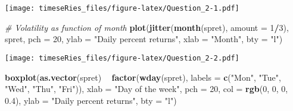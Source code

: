 \documentclass[]{book}
\newenvironment{Shaded}{\begin{snugshade}}{\end{snugshade}}
\newcommand{\KeywordTok}[1]{\textcolor[rgb]{0.13,0.29,0.53}{\textbf{#1}}}
\newcommand{\DataTypeTok}[1]{\textcolor[rgb]{0.13,0.29,0.53}{#1}}
\newcommand{\DecValTok}[1]{\textcolor[rgb]{0.00,0.00,0.81}{#1}}
\newcommand{\FloatTok}[1]{\textcolor[rgb]{0.00,0.00,0.81}{#1}}
\newcommand{\StringTok}[1]{\textcolor[rgb]{0.31,0.60,0.02}{#1}}
\newcommand{\CommentTok}[1]{\textcolor[rgb]{0.56,0.35,0.01}{\textit{#1}}}
\newcommand{\OperatorTok}[1]{\textcolor[rgb]{0.81,0.36,0.00}{\textbf{#1}}}
\newcommand{\NormalTok}[1]{#1}
\begin{document}
\begin{Shaded}
\end{Shaded}

\texttt{[image: timeseRies\_files/figure-latex/Question\_2-1.pdf]}

\begin{Shaded}
\begin{Highlighting}[]
\CommentTok{# Volatility as function of month}
\KeywordTok{plot}\NormalTok{(}\KeywordTok{jitter}\NormalTok{(}\KeywordTok{month}\NormalTok{(spret), }\DataTypeTok{amount =} \DecValTok{1}\OperatorTok{/}\DecValTok{3}\NormalTok{), spret, }\DataTypeTok{pch =} \DecValTok{20}\NormalTok{, }\DataTypeTok{ylab =} \StringTok{"Daily percent returns"}\NormalTok{, }
    \DataTypeTok{xlab =} \StringTok{"Month"}\NormalTok{, }\DataTypeTok{bty =} \StringTok{"l"}\NormalTok{)}
\end{Highlighting}
\end{Shaded}

\texttt{[image: timeseRies\_files/figure-latex/Question\_2-2.pdf]}

\begin{Shaded}
\begin{Highlighting}[]
\KeywordTok{boxplot}\NormalTok{(}\KeywordTok{as.vector}\NormalTok{(spret) }\OperatorTok{~}\StringTok{ }\KeywordTok{factor}\NormalTok{(}\KeywordTok{wday}\NormalTok{(spret), }\DataTypeTok{labels =} \KeywordTok{c}\NormalTok{(}\StringTok{"Mon"}\NormalTok{, }\StringTok{"Tue"}\NormalTok{, }\StringTok{"Wed"}\NormalTok{, }
    \StringTok{"Thu"}\NormalTok{, }\StringTok{"Fri"}\NormalTok{)), }\DataTypeTok{xlab =} \StringTok{"Day of the week"}\NormalTok{, }\DataTypeTok{pch =} \DecValTok{20}\NormalTok{, }\DataTypeTok{col =} \KeywordTok{rgb}\NormalTok{(}\DecValTok{0}\NormalTok{, }\DecValTok{0}\NormalTok{, }\DecValTok{0}\NormalTok{, }\FloatTok{0.4}\NormalTok{), }
    \DataTypeTok{ylab =} \StringTok{"Daily percent returns"}\NormalTok{, }\DataTypeTok{bty =} \StringTok{"l"}\NormalTok{)}
\end{Highlighting}
\end{Shaded}
\end{document}

